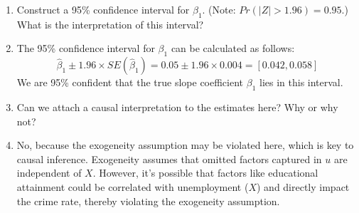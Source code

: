 \documentclass{./../../Latex/handout}
\begin{document}
\begin{enumerate}
	\item Construct a 95\% confidence interval for $\beta_1$. (Note: $Pr(|Z|>1.96)=0.95$.) What is the interpretation of this interval?
	\item[] The 95\% confidence interval for \(\beta_1\) can be calculated as follows:
	$$ \hat{\beta}_1 \pm 1.96 \times SE(\hat{\beta}_1) = 0.05 \pm 1.96 \times 0.004 = [0.042, 0.058] $$
	We are 95\% confident that the true slope coefficient $\beta_1$ lies in this interval. 
	\item Can we attach a causal interpretation to the estimates here? Why or why not?
	\item[] No, because the exogeneity assumption may be violated here, which is key to causal inference. Exogeneity assumes that omitted factors captured in \( u \) are independent of \( X \). However, it's possible that factors like educational attainment could be correlated with unemployment (\( X \)) and directly impact the crime rate, thereby violating the exogeneity assumption.
\end{enumerate}
\end{document}

